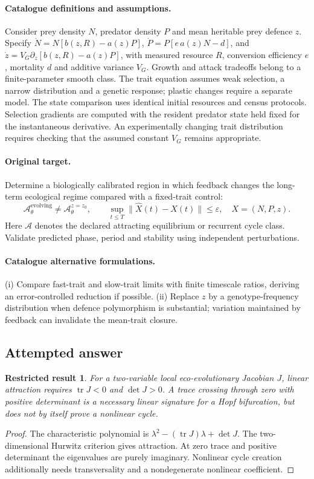 \documentclass[11pt]{article}
\newtheorem{attemptresult}{Restricted result}[section]
\begin{document}
\paragraph{Catalogue definitions and assumptions.}
Consider prey density $N$, predator density $P$ and mean heritable prey defence $z$. Specify $\dot N=N[b(z,R)-a(z)P]$, $\dot P=P[e\,a(z)N-d]$, and $\dot z=V_G\partial_z[b(z,R)-a(z)P]$, with measured resource $R$, conversion efficiency $e$, mortality $d$ and additive variance $V_G$. Growth and attack tradeoffs belong to a finite-parameter smooth class. The trait equation assumes weak selection, a narrow distribution and a genetic response; plastic changes require a separate model. The state comparison uses identical initial resources and census protocols. Selection gradients are computed with the resident predator state held fixed for the instantaneous derivative. An experimentally changing trait distribution requires checking that the assumed constant $V_G$ remains appropriate.
\paragraph{Original target.}
Determine a biologically calibrated region in which feedback changes the long-term ecological regime compared with a fixed-trait control:
\[
 \mathcal A_\theta^{\mathrm{evolving}}
 \ne\mathcal A_\theta^{z=z_0},\qquad
 \sup_{t\le T}\|\widehat X(t)-X(t)\|\le\varepsilon,
 \quad X=(N,P,z).
\]
Here $\mathcal A$ denotes the declared attracting equilibrium or recurrent cycle class. Validate predicted phase, period and stability using independent perturbations.
\paragraph{Catalogue alternative formulations.}
(i) Compare fast-trait and slow-trait limits with finite timescale ratios, deriving an error-controlled reduction if possible. (ii) Replace $z$ by a genotype-frequency distribution when defence polymorphism is substantial; variation maintained by feedback can invalidate the mean-trait closure.
\subsection{Attempted answer}
\begin{attemptresult}
For a two-variable local eco-evolutionary Jacobian $J$, linear attraction requires $\operatorname{tr}J<0$ and $\det J>0$. A trace crossing through zero with positive determinant is a necessary linear signature for a Hopf bifurcation, but does not by itself prove a nonlinear cycle.
\end{attemptresult}
\begin{proof}
The characteristic polynomial is $\lambda^2-(\operatorname{tr}J)\lambda+\det J$. The two-dimensional Hurwitz criterion gives attraction. At zero trace and positive determinant the eigenvalues are purely imaginary. Nonlinear cycle creation additionally needs transversality and a nondegenerate nonlinear coefficient.
\end{proof}
\end{document}
